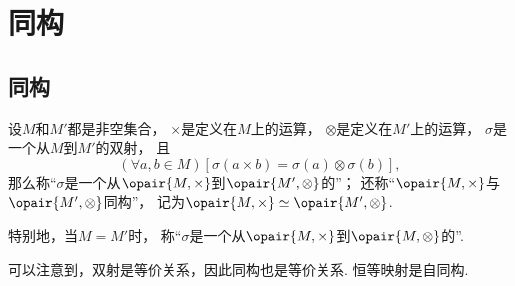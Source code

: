 \section{同构}
\subsection{同构}
\begin{definition}
设\(M\)和\(M'\)都是非空集合，
\(\times\)是定义在\(M\)上的运算，
\(\otimes\)是定义在\(M'\)上的运算，
\(\sigma\)是一个从\(M\)到\(M'\)的双射，
且\[
	(\forall a,b \in M)[\sigma(a \times b) = \sigma(a) \otimes \sigma(b)],
\]
那么称“\(\sigma\)是一个从\(\opair{M,\times}\)到\(\opair{M',\otimes}\)的”；
还称“\(\opair{M,\times}\)与\(\opair{M',\otimes}\)同构”，
记为\(\opair{M,\times} \simeq \opair{M',\otimes}\).

特别地，当\(M=M'\)时，
称“\(\sigma\)是一个从\(\opair{M,\times}\)到\(\opair{M,\otimes}\)的”.
\end{definition}

可以注意到，双射是等价关系，因此同构也是等价关系.
恒等映射是自同构.
